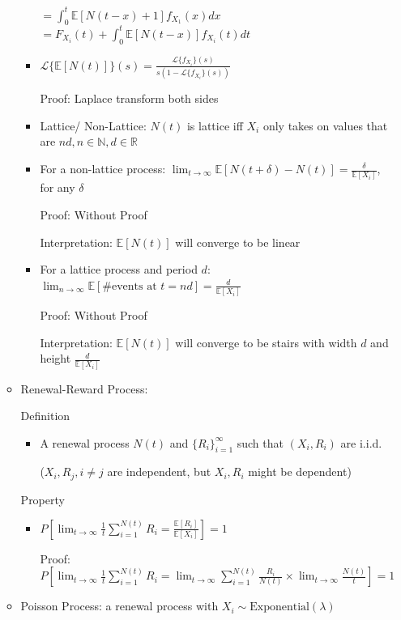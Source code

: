 \documentclass[a4paper]{article}
\begin{document}
\begin{itemize}
\begin{itemize}
\begin{itemize}
                        $= \int_0^t \mathbb{E}[N(t-x) + 1] f_{X_1}(x) dx$
                        $= F_{X_i}(t) + \int_0^t \mathbb{E}[N(t-x)] f_{X_i}(t) dt$
                    \item $\mathcal{L}\{\mathbb{E}[N(t)]\}(s) = \frac{\mathcal{L}\{f_{X_i}\}(s)}{s(1 - \mathcal{L}\{f_{X_i}\}(s))}$

                        Proof: Laplace transform both sides
                    \item Lattice/ Non-Lattice: $N(t)$ is lattice iff $X_i$ only takes on values that are $nd, n \in \mathbb{N}, d \in \mathbb{R}$
                    \item For a non-lattice process: $\lim_{t \rightarrow \infty} \mathbb{E}[N(t + \delta) - N(t)] = \frac{\delta}{\mathbb{E}[X_i]}$, for any $\delta$

                        Proof: Without Proof

                        Interpretation: $\mathbb{E}[N(t)]$ will converge to be linear
                    \item For a lattice process and period $d$: $\lim_{n \rightarrow \infty} \mathbb{E}[\text{\# events at $t = nd$}] = \frac{d}{\mathbb{E}[X_i]}$

                        Proof: Without Proof

                        Interpretation: $\mathbb{E}[N(t)]$ will converge to be stairs with width $d$ and height $\frac{d}{\mathbb{E}[X_i]}$
                \end{itemize}
            \item Renewal-Reward Process:

                Definition
                \begin{itemize}
                    \item A renewal process $N(t)$ and $\{R_i\}_{i = 1}^\infty$ such that $(X_i, R_i)$ are i.i.d.

                        ($X_i, R_j, i \not = j$ are independent, but $X_i, R_i$ might be dependent)
                \end{itemize}
                Property
                \begin{itemize}
                    \item $P[\lim_{t \rightarrow \infty} \frac{1}{t} \sum_{i=1}^{N(t)} R_i = \frac{\mathbb{E}[R_i]}{\mathbb{E}[X_i]}] = 1$

                        Proof: $P[\lim_{t \rightarrow \infty} \frac{1}{t} \sum_{i=1}^{N(t)} R_i = \lim_{t \rightarrow \infty} \sum_{i=1}^{N(t)} \frac{R_i}{N(t)} \times \lim_{t \rightarrow \infty} \frac{N(t)}{t}] = 1$
                \end{itemize}
            \item Poisson Process: a renewal process with $X_i \sim \text{Exponential}(\lambda)$


\end{itemize}
\end{itemize}
\end{document}
